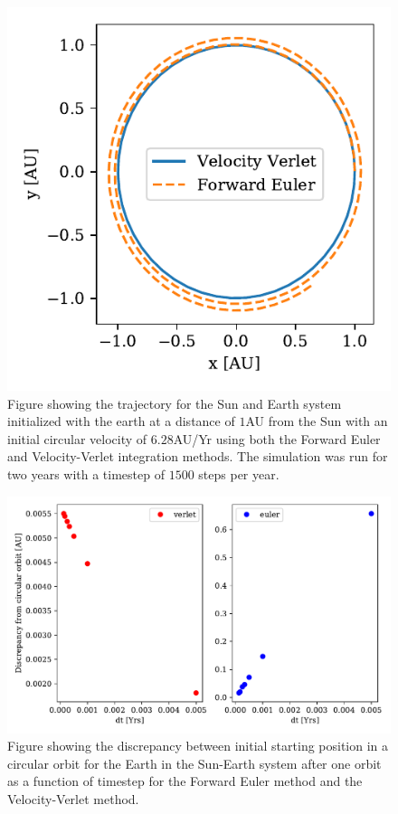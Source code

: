 \documentclass[twocolumn]{aastex62}
\begin{document}
\begin{figure}
\includegraphics[scale=1]{Figures/circularcomparison.pdf}
\caption{Figure showing the trajectory for the Sun and Earth system initialized with the earth at a distance of $1$AU from the Sun with an initial circular velocity of $6.28$AU/Yr using both the Forward Euler and Velocity-Verlet integration methods. The simulation was run for two years with a timestep of $1500$ steps per year.}
\label{fig:traj}
\end{figure}

\begin{figure}
\includegraphics[scale=1]{Figures/taskb_errors.pdf}
\caption{Figure showing the discrepancy between initial starting position in a circular orbit for the Earth in the Sun-Earth system after one orbit as a function of timestep for the Forward Euler method and the Velocity-Verlet method.}
\label{fig:error}
\end{figure}
\end{document}
